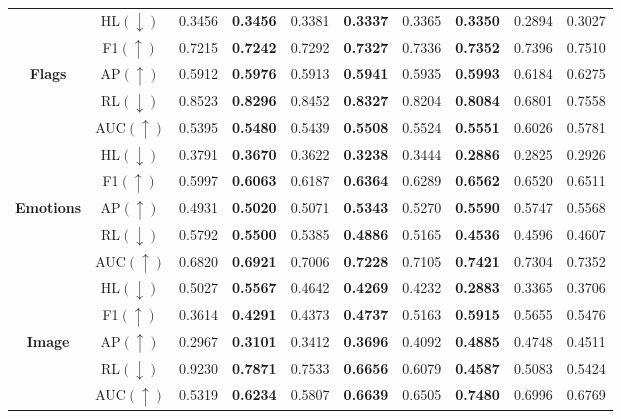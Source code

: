 \documentclass[12pt,a4paper,oneside,english]{report}
\begin{document}
\begin{table}
\begin{tabular}{|c|c|cc|cc|cc|cc|}
        ~ & HL$(\downarrow)$ & 0.3456 & \textbf{0.3456} & 0.3381 & \textbf{0.3337} & 0.3365 & \textbf{0.3350} & 0.2894 & 0.3027 \\ 
        ~ & F1$(\uparrow)$ & 0.7215 & \textbf{0.7242} & 0.7292 & \textbf{0.7327} & 0.7336 & \textbf{0.7352} & 0.7396 & 0.7510 \\ 
        \textbf{Flags} & AP$(\uparrow)$ & 0.5912 & \textbf{0.5976} & 0.5913 & \textbf{0.5941} & 0.5935 & \textbf{0.5993} & 0.6184 & 0.6275 \\ 
        ~ & RL$(\downarrow)$ & 0.8523 & \textbf{0.8296} & 0.8452 & \textbf{0.8327} & 0.8204 & \textbf{0.8084} & 0.6801 & 0.7558 \\ 
        ~ & AUC$(\uparrow)$ & 0.5395 & \textbf{0.5480} & 0.5439 & \textbf{0.5508} & 0.5524 & \textbf{0.5551} & 0.6026 & 0.5781 \\      
        \hline
        ~ & HL$(\downarrow)$ & 0.3791 & \textbf{0.3670 }& 0.3622 & \textbf{0.3238} & 0.3444 & \textbf{0.2886} & 0.2825 & 0.2926 \\ 
        ~ & F1$(\uparrow)$ & 0.5997 & \textbf{0.6063} & 0.6187 & \textbf{0.6364} & 0.6289 & \textbf{0.6562} & 0.6520 & 0.6511 \\ 
        \textbf{Emotions} & AP$(\uparrow)$ & 0.4931 & \textbf{0.5020} & 0.5071 & \textbf{0.5343} & 0.5270 & \textbf{0.5590} & 0.5747 & 0.5568 \\ 
        ~ & RL$(\downarrow)$ & 0.5792 & \textbf{0.5500} & 0.5385 & \textbf{0.4886} & 0.5165 & \textbf{0.4536} & 0.4596 & 0.4607 \\ 
        ~ & AUC$(\uparrow)$ & 0.6820 & \textbf{0.6921} & 0.7006 & \textbf{0.7228} & 0.7105 & \textbf{0.7421} & 0.7304 & 0.7352 \\ 
       \hline
        ~ & HL$(\downarrow)$ & 0.5027 & \textbf{0.5567} & 0.4642 & \textbf{0.4269} & 0.4232 & \textbf{0.2883} & 0.3365 & 0.3706 \\ 
        ~ & F1$(\uparrow)$ & 0.3614 & \textbf{0.4291} & 0.4373 & \textbf{0.4737} & 0.5163 & \textbf{0.5915} & 0.5655 & 0.5476 \\ 
        \textbf{Image} & AP$(\uparrow)$ & 0.2967 & \textbf{0.3101} & 0.3412 & \textbf{0.3696} & 0.4092 & \textbf{0.4885} & 0.4748 & 0.4511 \\ 
        ~ & RL$(\downarrow)$ & 0.9230 & \textbf{0.7871} & 0.7533 & \textbf{0.6656} & 0.6079 & \textbf{0.4587} & 0.5083 & 0.5424 \\ 
        ~ & AUC$(\uparrow)$ & 0.5319 & \textbf{0.6234} & 0.5807 & \textbf{0.6639} & 0.6505 & \textbf{0.7480} & 0.6996 & 0.6769 \\ 

\end{tabular}
\end{table}
\end{document}
